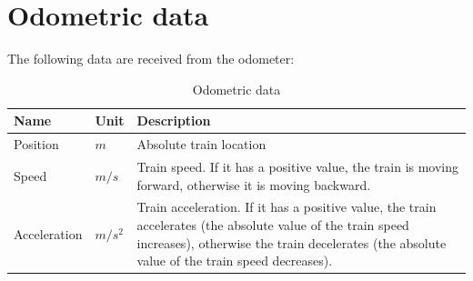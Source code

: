 \documentclass[nocc]{template/openetcs_report}
\begin{document}
\chapter{Odometric data}
\label{odometric_data}
The following data are received from the odometer:
\newline
\newline
			\begin{longtable}{|l|l|l|}
				\caption{Odometric data}\\ 
				\hline
				
					\begin{minipage}[t]{0.20\linewidth} \textbf{Name}	\end{minipage} 
				&	\begin{minipage}[t]{0.10\linewidth} \textbf{Unit}	\end{minipage} 
				&	\begin{minipage}[t]{0.70\linewidth} \textbf{Description} \end{minipage} \\
				
				\hline
				\begin{minipage}[t]{0.20\linewidth} Position	\end{minipage} 
				&	\begin{minipage}[t]{0.10\linewidth} $m$\end{minipage} 
				&	\begin{minipage}[t]{0.70\linewidth}Absolute train location\end{minipage} \\
				
				\hline
				\begin{minipage}[t]{0.20\linewidth} Speed	\end{minipage} 
				&	\begin{minipage}[t]{0.10\linewidth} $m/s$\end{minipage} 
				&	\begin{minipage}[t]{0.70\linewidth}Train speed.
				\newline
				If it has a positive value, the train is moving forward, otherwise it is moving backward.
				\end{minipage} \\
								
				\hline
				\begin{minipage}[t]{0.20\linewidth} Acceleration	\end{minipage} 
				&	\begin{minipage}[t]{0.10\linewidth} $m/s^2$\end{minipage} 
				&	\begin{minipage}[t]{0.70\linewidth}Train acceleration.
				\newline
				If it has a positive value, the train accelerates (the absolute value of the train speed increases), otherwise the train decelerates (the absolute value of the train speed decreases).
				\end{minipage} \\
								
				\hline
																																	
			\end{longtable}	
\end{document}

